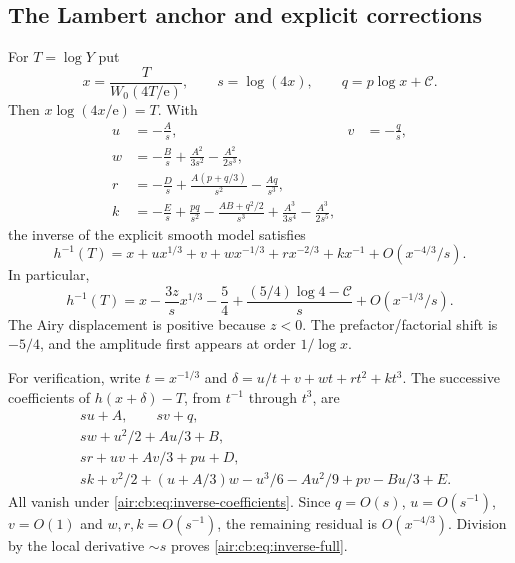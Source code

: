 \documentclass[11pt,letterpaper]{article}
\numberwithin{equation}{section}
\theoremstyle{remark}
\newcommand{\ee}{\mathrm e}
\begin{document}
\subsection{The Lambert anchor and explicit corrections}
For $T=\log Y$ put
\begin{equation}\label{air:cb:eq:lambert-anchor}
x=\frac{T}{W_0(4T/\ee)},\qquad s=\log(4x),\qquad
q=p\log x+\mathcal C.
\end{equation}
Then $x\log(4x/\ee)=T$. With
\begin{equation}\label{air:cb:eq:inverse-coefficients}
\begin{aligned}
u&=-\frac As,&v&=-\frac qs,\\
w&=-\frac Bs+\frac{A^2}{3s^2}-\frac{A^2}{2s^3},\\
r&=-\frac Ds+\frac{A(p+q/3)}{s^2}-\frac{Aq}{s^3},\\
k&=-\frac Es+\frac{pq}{s^2}-\frac{AB+q^2/2}{s^3}
+\frac{A^3}{3s^4}-\frac{A^3}{2s^5},
\end{aligned}
\end{equation}
the inverse of the explicit smooth model satisfies
\begin{equation}\label{air:cb:eq:inverse-full}
h^{-1}(T)=x+ux^{1/3}+v+wx^{-1/3}+rx^{-2/3}+kx^{-1}
+O(x^{-4/3}/s).
\end{equation}
In particular,
\begin{equation}\label{air:cb:eq:inverse-leading}
h^{-1}(T)=x-\frac{3z}{s}x^{1/3}-\frac54
+\frac{(5/4)\log4-\mathcal C}{s}+O(x^{-1/3}/s).
\end{equation}
The Airy displacement is positive because $z<0$. The prefactor/factorial
shift is $-5/4$, and the amplitude first appears at order $1/\log x$.

For verification, write $t=x^{-1/3}$ and
$\delta=u/t+v+wt+rt^2+kt^3$. The successive coefficients of
$h(x+\delta)-T$, from $t^{-1}$ through $t^3$, are
\begin{equation}\label{air:cb:eq:inverse-cancellation}
\begin{aligned}
&su+A,\qquad sv+q,\\
&sw+u^2/2+Au/3+B,\\
&sr+uv+Av/3+pu+D,\\
&sk+v^2/2+(u+A/3)w-u^3/6-Au^2/9+pv-Bu/3+E.
\end{aligned}
\end{equation}
All vanish under \eqref{air:cb:eq:inverse-coefficients}. Since $q=O(s)$,
$u=O(s^{-1})$, $v=O(1)$ and $w,r,k=O(s^{-1})$, the remaining residual is
$O(x^{-4/3})$. Division by the local derivative $\sim s$ proves
\eqref{air:cb:eq:inverse-full}.
\end{document}
